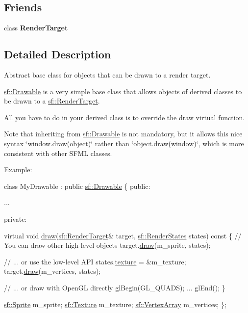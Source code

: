\subsection*{Friends}
\begin{DoxyCompactItemize}
\item 
\mbox{\label{classsf_1_1_drawable_aa5afc6f82b7b587ed5ada4d227ce32aa}} 
class {\bfseries Render\+Target}
\end{DoxyCompactItemize}


\subsection{Detailed Description}
Abstract base class for objects that can be drawn to a render target. 

\hyperlink{classsf_1_1_drawable}{sf\+::\+Drawable} is a very simple base class that allows objects of derived classes to be drawn to a \hyperlink{classsf_1_1_render_target}{sf\+::\+Render\+Target}.

All you have to do in your derived class is to override the draw virtual function.

Note that inheriting from \hyperlink{classsf_1_1_drawable}{sf\+::\+Drawable} is not mandatory, but it allows this nice syntax \char`\"{}window.\+draw(object)\char`\"{} rather than \char`\"{}object.\+draw(window)\char`\"{}, which is more consistent with other S\+F\+ML classes.

Example\+: 
\begin{DoxyCode}
\textcolor{keyword}{class }MyDrawable : \textcolor{keyword}{public} \hyperlink{classsf_1_1_drawable}{sf::Drawable}
\{
\textcolor{keyword}{public}:

   ...

private:

    \textcolor{keyword}{virtual} \textcolor{keywordtype}{void} \hyperlink{classsf_1_1_drawable_a90d2c88bba9b035a0844eccb380ef631}{draw}(\hyperlink{classsf_1_1_render_target}{sf::RenderTarget}& target, 
      \hyperlink{classsf_1_1_render_states}{sf::RenderStates} states)\textcolor{keyword}{ const}
\textcolor{keyword}{    }\{
        \textcolor{comment}{// You can draw other high-level objects}
        target.\hyperlink{classsf_1_1_render_target_a12417a3bcc245c41d957b29583556f39}{draw}(m\_sprite, states);

        \textcolor{comment}{// ... or use the low-level API}
        states.\hyperlink{classsf_1_1_render_states_a457fc5a41731889de9cf39cf9b3436c3}{texture} = &m\_texture;
        target.\hyperlink{classsf_1_1_render_target_a12417a3bcc245c41d957b29583556f39}{draw}(m\_vertices, states);

        \textcolor{comment}{// ... or draw with OpenGL directly}
        glBegin(GL\_QUADS);
        ...
        glEnd();
    \}

    \hyperlink{classsf_1_1_sprite}{sf::Sprite} m\_sprite;
    \hyperlink{classsf_1_1_texture}{sf::Texture} m\_texture;
    \hyperlink{classsf_1_1_vertex_array}{sf::VertexArray} m\_vertices;
\};
\end{DoxyCode}


